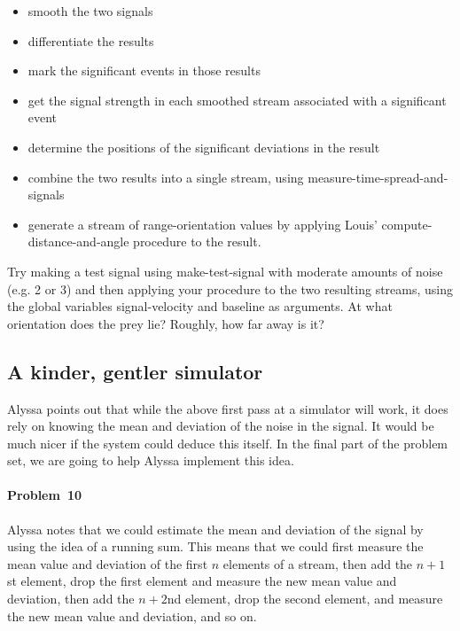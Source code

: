 \begin{itemize}

\item smooth the two signals

\item differentiate the results

\item mark the  significant events in those results

\item get the signal strength in each smoothed stream associated with
      a significant event

\item determine the positions of the significant deviations in the
      result 

\item combine the two results  into a single stream, using {\cf
      measure-time-spread-and-signals}

\item generate a stream of range-orientation values by applying Louis'
      {\cf compute-distance-and-angle} procedure to the result.

\end{itemize}


Try making a test signal using {\cf make-test-signal} with moderate
amounts of noise (e.g. 2 or 3) and then applying your procedure to the
two resulting streams, using the global variables {\cf
signal-velocity} and {\cf baseline} as arguments.  At what orientation
does the prey lie?   Roughly, how far away is it?


\subsection{A kinder, gentler simulator}

Alyssa points out that while the above first pass at a simulator will
work, it does rely on knowing the mean and deviation of the noise in the
signal. It would be much nicer if the system could deduce this
itself.  In the final part of the problem set, we are going to help
Alyssa implement this idea.


\paragraph{Problem~10}
Alyssa notes that we could estimate the mean and deviation
of the signal
by using the idea of a running sum.  This means that we could first
measure the mean value and deviation of the first $n$ elements of a
stream, then add the $n+1$st element, drop the first element and measure
the new mean value and deviation, then add the $n+2$nd element, drop
the second element, and measure the new mean value and deviation, and so on.

